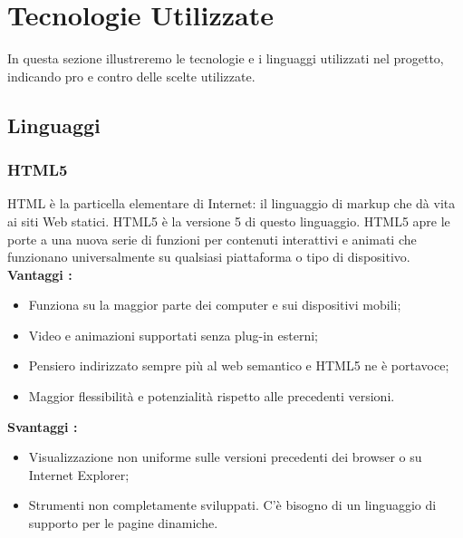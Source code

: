 \section{Tecnologie Utilizzate}{
	In questa sezione illustreremo le tecnologie e i linguaggi utilizzati nel progetto, indicando pro e contro delle scelte utilizzate.
	\subsection{Linguaggi}{
		\subsubsection{HTML5}{
			HTML è la particella elementare di Internet: il linguaggio di markup che dà vita ai siti Web statici. HTML5 è la versione 5 di questo linguaggio. HTML5 apre le porte a una nuova serie di funzioni per contenuti interattivi e animati che funzionano universalmente su qualsiasi piattaforma o tipo di dispositivo.
			\textbf{Vantaggi :}
			\begin{itemize}\itemsep1pt
				\item Funziona su la maggior parte dei computer e sui dispositivi mobili;
				\item Video e animazioni supportati senza plug-in esterni;
				\item Pensiero indirizzato sempre più al web semantico e HTML5 ne è portavoce;
				\item Maggior flessibilità e potenzialità rispetto alle precedenti versioni.
			\end{itemize}
			\textbf{Svantaggi :}
			\begin{itemize}\itemsep1pt
				\item Visualizzazione non uniforme sulle versioni precedenti dei browser o su Internet Explorer;
				\item Strumenti non completamente sviluppati. C'è bisogno di un linguaggio di supporto per le pagine dinamiche.
			\end{itemize}
		}
}}

